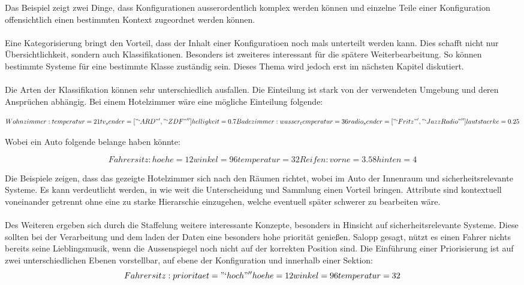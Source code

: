 Das Beispiel zeigt zwei Dinge, dass Konfigurationen ausserordentlich komplex werden können und einzelne Teile einer Konfiguration offensichtlich einen bestimmten Kontext zugeordnet werden können. 
\\\\
Eine Kategorisierung bringt den Vorteil, dass der Inhalt einer Konfiguratioen noch mals unterteilt werden kann. Dies schafft nicht nur Übersichtlichkeit, sondern auch Klassifikationen. Besonders ist zweiteres interessant für die spätere Weiterbearbeitung. So können bestimmte Systeme für eine bestimmte Klasse zuständig sein. Dieses Thema wird jedoch erst im nächsten Kapitel diskutiert. 
\\\\
Die Arten der Klassifikation können sehr unterschiedlich ausfallen. Die Einteilung ist stark von der verwendeten Umgebung und deren Ansprüchen abhängig. Bei einem Hotelzimmer wäre eine mögliche Einteilung folgende: 

\begin{equation}
   	Wohnzimmer: 
		temperatur = 21
		tv_sender = ["`ARD"', "`ZDF"'']
		helligkeit = 0.7
	Badezimmer: 
		wasser_temperatur = 36
		radio_sender = ["`Fritz"', "`Jazz Radio"'']
		lautstaerke = 0.25
\end{equation} 

Wobei ein Auto folgende belange haben könnte:

\begin{equation}
   	Fahrersitz:
		hoehe = 12
		winkel = 96
		temperatur = 32
	Reifen: 
		vorne = 3.58
		hinten = 4
\end{equation} 


Die Beispiele zeigen, dass das gezeigte Hotelzimmer sich nach den Räumen richtet, wobei im Auto der Innenraum und sicherheitsrelevante Systeme. Es kann verdeutlicht werden, in wie weit die Unterscheidung und Sammlung einen Vorteil bringen. Attribute sind kontextuell voneinander getrennt ohne eine zu starke Hierarschie einzugehen, welche eventuell später schwerer zu bearbeiten wäre.
\\\\
Des Weiteren ergeben sich durch die Staffelung weitere interessante Konzepte, besonders in Hinsicht auf sicherheitsrelevante Systeme. Diese sollten bei der Verarbeitung und dem laden der Daten eine besonders hohe priorität genießen. Salopp gesagt, nützt es einen Fahrer nichts bereits seine Lieblingsmusik, wenn die Aussenspiegel noch nicht auf der korrekten Position sind. Die Einführung einer Priorisierung ist auf zwei unterschiedlichen Ebenen vorstellbar, auf ebene der Konfiguration und innerhalb einer Sektion: 
\begin{equation}
   	Fahrersitz:
		prioritaet = "`hoch"''
		hoehe = 12
		winkel = 96
		temperatur = 32
\end{equation} 



